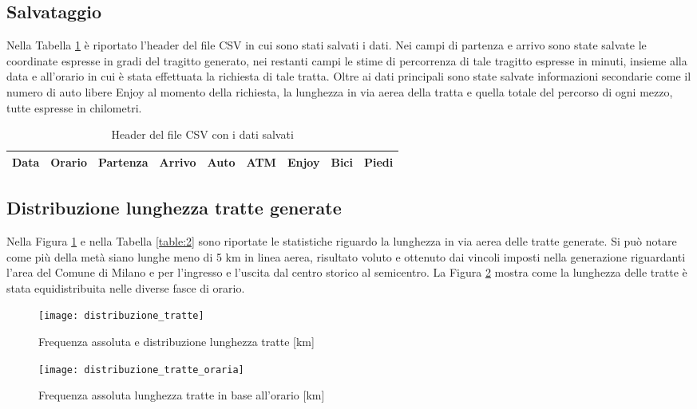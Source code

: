 \subsection{Salvataggio}

Nella Tabella \ref{table:7} è riportato l'header del file CSV in cui sono stati salvati i dati. Nei campi di partenza e arrivo sono state salvate le coordinate espresse in gradi del tragitto generato, nei restanti campi le stime di percorrenza di tale tragitto espresse in minuti, insieme alla data e all'orario in cui è stata effettuata la richiesta di tale tratta. Oltre ai dati principali sono state salvate informazioni secondarie come il numero di auto libere Enjoy al momento della richiesta, la lunghezza in via aerea della tratta e quella totale del percorso di ogni mezzo, tutte espresse in chilometri.

\begin{table}[H]
	\centering
	\begin{tabular}{ | c | c | c | c | c | c | c | c | c | }
		\hline
		Data & Orario & Partenza & Arrivo & Auto & ATM & Enjoy & Bici & Piedi \\
		\hline
	\end{tabular}
	\caption{Header del file CSV con i dati salvati}
	\label{table:7}
\end{table}

\subsection{Distribuzione lunghezza tratte generate}

Nella Figura \ref{image:2} e nella Tabella \ref{table:2} sono riportate le statistiche riguardo la lunghezza in via aerea delle tratte generate. Si può notare come più della metà siano lunghe meno di 5 km in linea aerea, risultato voluto e ottenuto dai vincoli imposti nella generazione riguardanti l'area del Comune di Milano e per l'ingresso e l'uscita dal centro storico al semicentro. La Figura \ref{image:19} mostra come la lunghezza delle tratte è stata equidistribuita nelle diverse fasce di orario.

\begin{figure}[H]
\centering
\texttt{[image: distribuzione\_tratte]}
\caption{Frequenza assoluta e distribuzione lunghezza tratte [km]}
\label{image:2}
\end{figure}

\begin{figure}[H]
\centering
\texttt{[image: distribuzione\_tratte\_oraria]}
\caption{Frequenza assoluta lunghezza tratte in base all'orario [km]}
\label{image:19}
\end{figure}

